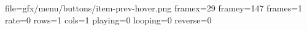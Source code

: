 file=gfx/menu/buttons/item-prev-hover.png
framex=29
framey=147
frames=1
rate=0
rows=1
cols=1
playing=0
looping=0
reverse=0